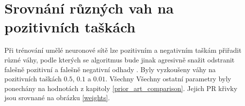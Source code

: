 
\section{Srovnání různých vah na pozitivních taškách}
Při trénování umělé neuronové sítě lze pozitivním a negativním taškám přiřadit různé váhy, podle kterých se algoritmus bude jinak agresivně snažit odstranit falešně pozitivní a falešně negativní odhady . Byly vyzkoušeny váhy na pozitivních taškách \( 0.5 \), \( 0.1 \) a \( 0.01 \). Všechny Všechny ostatní parametry byly ponechány na hodnotách z kapitoly \ref{prior_art_comparison}. Jejich PR křivky jsou srovnané na obrázku \ref{weights}.

